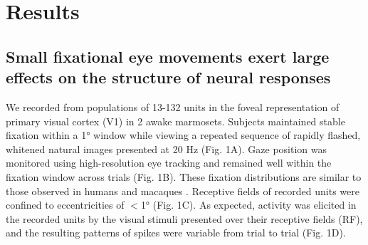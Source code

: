 \documentclass{lite}
\begin{document}


\section{Results}

\subsection{Small fixational eye movements exert large effects on the structure of neural responses}

We recorded from populations of 13-132 units in the foveal representation of primary visual cortex (V1) in 2 awake marmosets. Subjects maintained stable fixation within a 1° window while viewing a repeated sequence of rapidly flashed, whitened natural images presented at 20 Hz (Fig. 1A). Gaze position was monitored using high-resolution eye tracking \cite{yates2023detailed} and remained well within the fixation window across trials (Fig. 1B). These fixation distributions are similar to those observed in humans and macaques \cite{cherici2012precision, ressmeyer2025openirisdpi}. Receptive fields of recorded units were confined to eccentricities of $<$1° (Fig. 1C). As expected, activity was elicited in the recorded units by the visual stimuli presented over their receptive fields (RF), and the resulting patterns of spikes were variable from trial to trial (Fig. 1D). 
\end{document}
